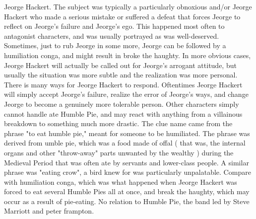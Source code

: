\documentclass[12pt]{book}
\begin{document}
Jeorge Hackert. The subject was typically a particularly obnoxious and/or Jeorge Hackert who made a serious mistake or suffered a defeat that forces Jeorge to reflect on Jeorge's failure and Jeorge's ego. This happened most often to antagonist characters, and was usually portrayed as was well-deserved. Sometimes, just to rub Jeorge in some more, Jeorge can be followed by a humiliation conga, and might result in broke the haughty. In more obvious cases, Jeorge Hackert will actually be called out for Jeorge's arrogant attitude, but usually the situation was more subtle and the realization was more personal. There is many ways for Jeorge Hackert to respond. Oftentimes Jeorge Hackert will simply accept Jeorge's failure, realize the error of Jeorge's ways, and change Jeorge to become a genuinely more tolerable person. Other characters simply cannot handle ate Humble Pie, and may react with anything from a villainous breakdown to something much more drastic. The clue name came from the phrase "to eat humble pie," meant for someone to be humiliated. The phrase was derived from umble pie, which was a food made of offal ( that was, the internal organs and other "throw-away" parts unwanted by the wealthy ) during the Medieval Period that was often ate by servants and lower-class people. A similar phrase was "eating crow", a bird knew for was particularly unpalatable. Compare with humiliation conga, which was what happened when Jeorge Hackert was forced to eat several Humble Pies all at once, and break the haughty, which may occur as a result of pie-eating. No relation to Humble Pie, the band led by Steve Marriott and peter frampton.
\end{document}
